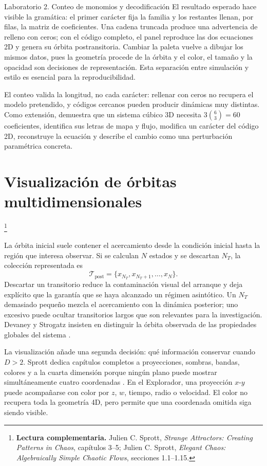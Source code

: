 \documentclass[11pt]{article}
\newcommand{\lecturasprott}[1]{%
  \par\noindent{\sffamily\scriptsize\color{Teal}Lectura complementaria}\footnote{%
  \textbf{Lectura complementaria.} #1}\par}
\begin{document}
\begin{laboratorio}{Laboratorio 2. Conteo de monomios y decodificación}
El resultado esperado hace visible la gramática: el primer carácter fija la familia y
los restantes llenan, por filas, la matriz de coeficientes. Una cadena truncada produce
una advertencia de relleno con ceros; con el código completo, el panel reproduce las dos
ecuaciones 2D y genera su órbita postransitoria. Cambiar la paleta vuelve a dibujar los
mismos datos, pues la geometría procede de la órbita y el color, el tamaño y la opacidad
son decisiones de representación. Esta separación entre simulación y estilo es esencial
para la reproducibilidad.

El conteo valida la longitud, no cada carácter: rellenar con ceros no recupera el modelo
pretendido, y códigos cercanos pueden producir dinámicas muy distintas. Como extensión,
demuestra que un sistema cúbico 3D necesita \(3\binom{6}{3}=60\) coeficientes,
identifica sus letras de mapa y flujo, modifica un carácter del código 2D, reconstruye la
ecuación y describe el cambio como una perturbación paramétrica concreta.
\end{laboratorio}



\section{Visualización de órbitas multidimensionales}
\lecturasprott{Julien C. Sprott, \emph{Strange Attractors: Creating Patterns in Chaos}, capítulos 3--5; Julien C. Sprott, \emph{Elegant Chaos: Algebraically Simple Chaotic Flows}, secciones 1.1--1.15.}

La órbita inicial suele contener el acercamiento desde la condición inicial hasta la
región que interesa observar. Si se calculan \(N\) estados y se descartan \(N_T\), la
colección representada es
\[
 \mathcal{T}_{\mathrm{post}}=
 \{x_{N_T},x_{N_T+1},\ldots,x_N\}.
\]
Descartar un transitorio reduce la contaminación visual del arranque y deja explícito que la garantía
que se haya alcanzado un régimen asintótico. Un \(N_T\) demasiado pequeño mezcla el
acercamiento con la dinámica posterior; uno excesivo puede ocultar transitorios largos
que son relevantes para la investigación. Devaney y Strogatz insisten en distinguir la
órbita observada de las propiedades globales del sistema
\cite{devaney2022,strogatz2018}.

La visualización añade una segunda decisión: qué información conservar cuando
\(D>2\). Sprott dedica capítulos completos a proyecciones, sombras, bandas, colores y a
la cuarta dimensión porque ningún plano puede mostrar simultáneamente cuatro
coordenadas \cite{sprott1993}. En el Explorador, una proyección \(x\)-\(y\) puede
acompañarse con color por \(z\), \(w\), tiempo, radio o velocidad. El color no recupera
toda la geometría 4D, pero permite que una coordenada omitida siga siendo visible.
\end{document}
